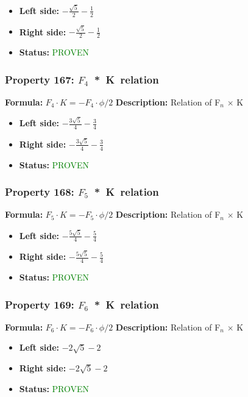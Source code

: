 \begin{itemize}
\item \textbf{Left side:} $- \frac{\sqrt{5}}{2} - \frac{1}{2}$
\item \textbf{Right side:} $- \frac{\sqrt{5}}{2} - \frac{1}{2}$
\item \textbf{Status:} \textcolor{green}{PROVEN}
\end{itemize}

\subsubsection*{Property 167: $F_{4}$~*~K~relation}
\textbf{Formula:} $F_4 \cdot K = -F_4 \cdot \phi/2$
\textbf{Description:} Relation of F$_n$ $\times$ K

\begin{itemize}
\item \textbf{Left side:} $- \frac{3 \sqrt{5}}{4} - \frac{3}{4}$
\item \textbf{Right side:} $- \frac{3 \sqrt{5}}{4} - \frac{3}{4}$
\item \textbf{Status:} \textcolor{green}{PROVEN}
\end{itemize}

\subsubsection*{Property 168: $F_{5}$~*~K~relation}
\textbf{Formula:} $F_5 \cdot K = -F_5 \cdot \phi/2$
\textbf{Description:} Relation of F$_n$ $\times$ K

\begin{itemize}
\item \textbf{Left side:} $- \frac{5 \sqrt{5}}{4} - \frac{5}{4}$
\item \textbf{Right side:} $- \frac{5 \sqrt{5}}{4} - \frac{5}{4}$
\item \textbf{Status:} \textcolor{green}{PROVEN}
\end{itemize}

\subsubsection*{Property 169: $F_{6}$~*~K~relation}
\textbf{Formula:} $F_6 \cdot K = -F_6 \cdot \phi/2$
\textbf{Description:} Relation of F$_n$ $\times$ K

\begin{itemize}
\item \textbf{Left side:} $- 2 \sqrt{5} - 2$
\item \textbf{Right side:} $- 2 \sqrt{5} - 2$
\item \textbf{Status:} \textcolor{green}{PROVEN}
\end{itemize}

